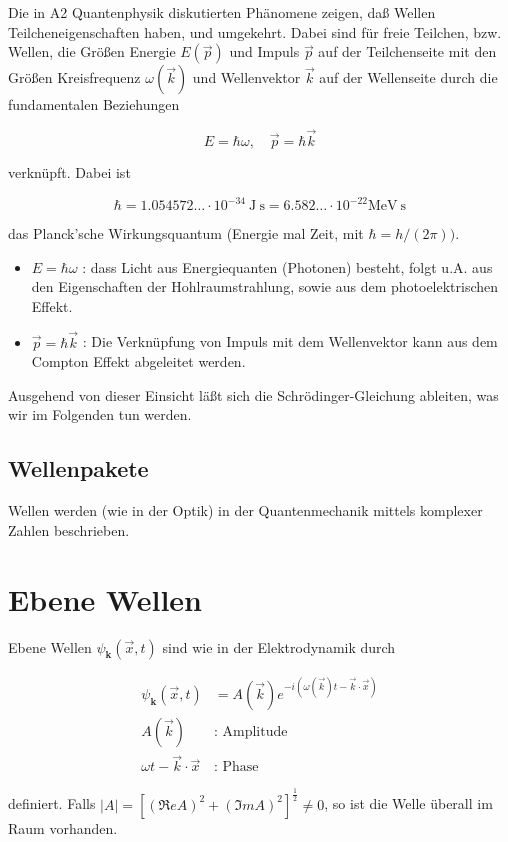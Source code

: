 \documentclass[10pt, letterpaper]{article}
\begin{document}
Die in A2 Quantenphysik diskutierten Phänomene zeigen, daß Wellen Teilcheneigenschaften haben, und umgekehrt. Dabei sind für freie Teilchen, bzw. Wellen, die Größen Energie $E(\vec{p})$ und Impuls $\vec{p}$ auf der Teilchenseite mit den Größen Kreisfrequenz $\omega(\vec{k})$ und Wellenvektor $\vec{k}$ auf der Wellenseite durch die fundamentalen Beziehungen

$$
E=\hbar \omega, \quad \vec{p}=\hbar \vec{k}
$$

verknüpft. Dabei ist

$$
\hbar=1.054572 \ldots \cdot 10^{-34} \mathrm{~J} \mathrm{~s}=6.582 \ldots \cdot 10^{-22} \mathrm{MeV} \mathrm{~s}
$$

das Planck'sche Wirkungsquantum (Energie mal Zeit, mit $\hbar=h /(2 \pi))$.

\begin{itemize}
  \item $E=\hbar \omega$ : dass Licht aus Energiequanten (Photonen) besteht, folgt u.A. aus den Eigenschaften der Hohlraumstrahlung, sowie aus dem photoelektrischen Effekt.
  \item $\vec{p}=\hbar \vec{k}$ : Die Verknüpfung von Impuls mit dem Wellenvektor kann aus dem Compton Effekt abgeleitet werden.
\end{itemize}

Ausgehend von dieser Einsicht läßt sich die Schrödinger-Gleichung ableiten, was wir im Folgenden tun werden.

\subsection*{Wellenpakete}
Wellen werden (wie in der Optik) in der Quantenmechanik mittels komplexer Zahlen beschrieben.

\section*{Ebene Wellen}
Ebene Wellen $\psi_{\mathbf{k}}(\vec{x}, t)$ sind wie in der Elektrodynamik durch

$$
\begin{aligned}
\psi_{\mathbf{k}}(\vec{x}, t) & =A(\vec{k}) e^{-i(\omega(\vec{k}) t-\vec{k} \cdot \vec{x})} \\
A(\vec{k}) & : \text { Amplitude } \\
\omega t-\vec{k} \cdot \vec{x} & : \text { Phase }
\end{aligned}
$$

definiert. Falls $|A|=\left[(\Re e A)^{2}+(\Im m A)^{2}\right]^{\frac{1}{2}} \neq 0$, so ist die Welle überall im Raum vorhanden.
\end{document}
